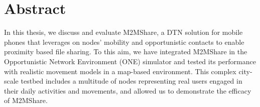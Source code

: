 \chapter*{Abstract}
\label{abstract}
In this thesis, we discuss and evaluate M2MShare, a DTN solution for mobile phones that leverages on nodes' mobility and opportunistic contacts to enable proximity based file sharing. To this aim, we have integrated M2MShare in the Opportunistic Network Environment (ONE) simulator and tested its performance with realistic movement models in a map-based environment. This complex city-scale testbed includes a multitude of nodes representing real users engaged in their daily activities and movements, and allowed us to demonstrate the efficacy of M2MShare.

